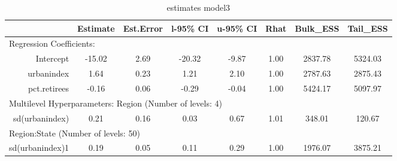 \documentclass[12pt]{article}
\begin{document}
\begin{table}[ht]
	\centering
	\begin{adjustbox}{max width=\textwidth}
	\begin{tabular}{rccccccc}
		\hline
		& Estimate & Est.Error & l-95\% CI & u-95\% CI & Rhat & Bulk\_ESS & Tail\_ESS \\ 
		\hline
		 \multicolumn{8}{l}{Regression Coefficients:} \\
		Intercept & -15.02 & 2.69 & -20.32 & -9.87 & 1.00 & 2837.78 & 5324.03 \\ 
		urbanindex & 1.64 & 0.23 & 1.21 & 2.10 & 1.00 & 2787.63 & 2875.43 \\ 
		pct.retirees & -0.16 & 0.06 & -0.29 & -0.04 & 1.00 & 5424.17 & 5097.97 \\
		\midrule
		\multicolumn{8}{l}{Multilevel Hyperparameters: Region (Number of levels: 4)} \\ 
		sd(urbanindex) & 0.21 & 0.16 & 0.03 & 0.67 & 1.01 & 348.01 & 120.67 \\ 
		\midrule
		\multicolumn{8}{l}{Region:State (Number of levels: 50)}  \\
		sd(urbanindex)1 & 0.19 & 0.05 & 0.11 & 0.29 & 1.00 & 1976.07 & 3875.21 \\ 
		\hline
	\end{tabular}
	\end{adjustbox}
	\caption{estimates model3}
	\label{tab:model3}
\end{table}
\end{document}
